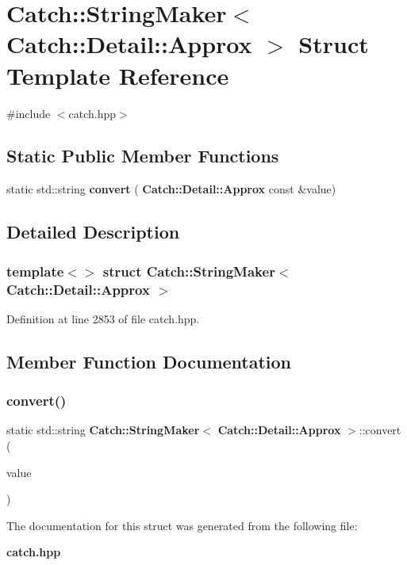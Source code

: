\section{Catch\+::String\+Maker$<$ Catch\+::Detail\+::Approx $>$ Struct Template Reference}
\label{struct_catch_1_1_string_maker_3_01_catch_1_1_detail_1_1_approx_01_4}


{\ttfamily \#include $<$catch.\+hpp$>$}

\subsection*{Static Public Member Functions}
\begin{DoxyCompactItemize}
\item 
static std\+::string \textbf{ convert} (\textbf{ Catch\+::\+Detail\+::\+Approx} const \&value)
\end{DoxyCompactItemize}


\subsection{Detailed Description}
\subsubsection*{template$<$$>$\newline
struct Catch\+::\+String\+Maker$<$ Catch\+::\+Detail\+::\+Approx $>$}



Definition at line 2853 of file catch.\+hpp.



\subsection{Member Function Documentation}
\mbox{\label{struct_catch_1_1_string_maker_3_01_catch_1_1_detail_1_1_approx_01_4_a8e5015720682fecfbff0f05de19a698f}} 
\subsubsection{convert()}
{\footnotesize\ttfamily static std\+::string \textbf{ Catch\+::\+String\+Maker}$<$ \textbf{ Catch\+::\+Detail\+::\+Approx} $>$\+::convert (\begin{DoxyParamCaption}\item[{\textbf{ Catch\+::\+Detail\+::\+Approx} const \&}]{value }\end{DoxyParamCaption})\hspace{0.3cm}{\ttfamily [static]}}



The documentation for this struct was generated from the following file\+:\begin{DoxyCompactItemize}
\item 
\textbf{ catch.\+hpp}\end{DoxyCompactItemize}
